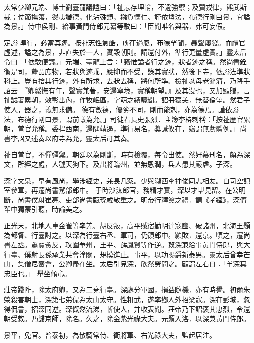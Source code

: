 \begin{pinyinscope}
 太常少卿元端、博士劉臺龍議謚曰：「祉志存埋輪，不避強禦；及贊戎律，熊武斯裁；仗節撫籓，邊夷識德，化沾殊類，襁負懷仁。謹依謚法，布德行剛曰景，宜謚為景。」侍中侯剛、給事黃門侍郎元纂等駮曰：「臣聞唯名與器，弗可妄假。



 定謚
 準行，必當其迹。按祉志性急酷，所在過威，布德罕聞，暴聲屢發。而禮官虛述，謚之為景，非直失於一人，實毀朝則。請還付外，準行更量虛實。」靈太后令曰：「依駮便議。」元端、臺龍上言：「竊惟謚者行之迹，狀者迹之稱。然尚書銓衡是司，釐品庶物，若狀與迹乖，應抑而不受，錄其實狀，然後下寺，依謚法準狀科上。豈有捨其行迹，外有所求，去狀去稱，將何所準。檢祉以母老辭籓，乃降手詔云：『卿綏撫有年，聲實兼著，安邊寧境，實稱朝望。』及其沒也，又加顯贈，言祉誠著累朝，效彰出內，作牧岷區，字萌之績驟聞。詔冊褒美，無替倫望。然君子使人，器之，義無求備。
 德有數德，優劣不同，剛而能剋，亦為德焉。謹依謚法，布德行剛曰景，謂前議為允。」司徙右長史張烈、主簿李枿刺稱：「按祉歷官累朝，當官允稱。委捍西南，邊隅靖遏，準行易名，獎誡攸在，竊謂無虧體例。」尚書李詔又述奏以府寺為允，靈太后可其奏。



 祉自當官，不憚彊禦。朝廷以為剛斷，時有檢覆，每令出使。然好慕刑名，頗為深文，所經之處，人號天狗下。及出將臨州，並無恩潤，兵人患其嚴虐。子深。



 深字文泉，早有風尚，學涉經史，兼長几案。少與隴西李神俊同志相友。自司空記室參軍，再遷尚書駕部郎中。
 于時沙汰郎官，務精才實，深以才堪見留。在公明斷，尚書僕射崔亮、吏部尚書甄琛咸敬重之。明帝行釋奠之禮，講《孝經》，深儕輩中獨蒙引聽，時論美之。



 正光末，北地人車金雀等率羌、胡反叛，高平賊宿勤明達寇豳、破諸州，北海王顥為都督、行臺討之。以深為行臺右丞、軍司，仍領郎中。顥敗，還京。頃之，遷尚書左丞。蕭寶夤反，攻圍華州，王平、薛鳳賢等作逆。敕深兼給事黃門侍郎，與大行臺、僕射長孫承業共會潼關，規模進止。事平，以功賜爵新泰男。靈太后曾幸芒山，集僧尼齋會，公卿盡在坐。太后引見深，欣然勞問之。顧謂左右曰：「羊深真忠臣也。」
 舉坐傾心。



 莊帝踐阼，除太府卿，又為二兗行臺。深處分軍國，損益隨機，亦有時譽。初爾朱榮殺害朝士，深第七弟侃為太山太守。性粗武，遂率鄉人外招梁寇。深在彭城，忽得侃書，招深同逆。深慨然流涕，斬使人，并收表聞。莊帝乃下詔褒其忠烈，令還朝受敕。乃歸京師，除名。久之，除金紫光祿大夫。元顥入洛，以深兼黃門侍郎。



 景平，免官。普泰初，為散騎常侍、衛將軍、右光祿大夫，監起居注。




\end{pinyinscope}
